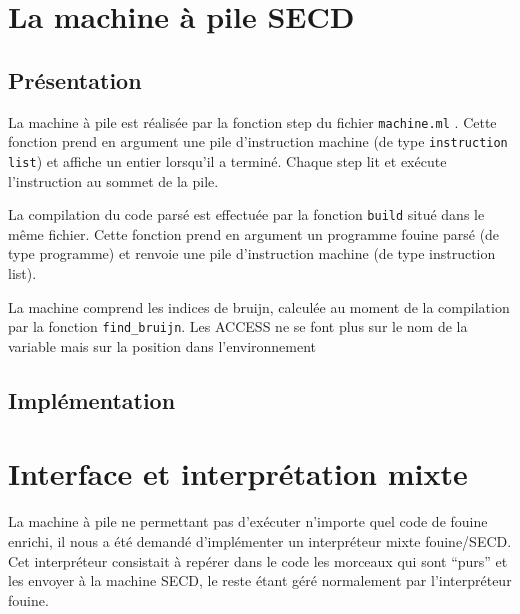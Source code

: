 \section{La machine à pile SECD} %

\subsection{Présentation}

La machine à pile est réalisée par la fonction step du fichier \texttt{machine.ml} . Cette fonction prend en argument une pile d'instruction machine (de type \texttt{instruction list}) et affiche un entier lorsqu'il a terminé. Chaque step lit et exécute l'instruction au sommet de la pile.

La compilation du code parsé est effectuée par la fonction \texttt{build} situé dans le même fichier. Cette fonction prend en argument un programme fouine parsé (de type programme) et renvoie une pile d'instruction machine (de type instruction list).

La machine comprend les indices de bruijn, calculée au moment de la compilation par la fonction \texttt{find\_bruijn}. Les ACCESS ne se font plus sur le nom de la variable mais sur la position dans l'environnement

\subsection{Implémentation}






\section{Interface et interprétation mixte}

La machine à pile ne permettant pas d'exécuter n'importe quel code de fouine enrichi, il nous a été demandé d'implémenter un interpréteur mixte fouine/SECD. Cet interpréteur consistait à repérer dans le code les morceaux qui sont ``purs'' et les envoyer à la machine SECD, le reste étant géré normalement par l'interpréteur fouine.

